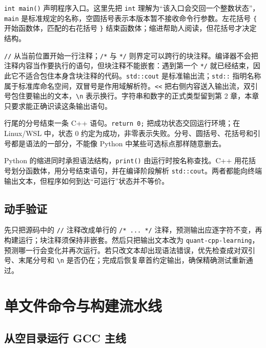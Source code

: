 \texttt{int main()} 声明程序入口。这里先把 \texttt{int} 理解为“该入口会交回一个整数状态”，\texttt{main} 是标准规定的名称，空圆括号表示本版本暂不接收命令行参数。左花括号 \texttt{\{} 开始函数体，匹配的右花括号 \texttt{\}} 结束函数体；缩进帮助人阅读，但花括号才决定结构。

\texttt{//} 从当前位置开始一行注释；\texttt{/*} 与 \texttt{*/} 则界定可以跨行的块注释。编译器不会把注释内容当作要执行的语句，但块注释不能嵌套：遇到第一个 \texttt{*/} 就已经结束，因此它不适合包住本身含块注释的代码。\texttt{std::cout} 是标准输出流；\texttt{std::} 指明名称属于标准库命名空间，双冒号是作用域解析符。\texttt{<<} 把右侧内容送入输出流，双引号包住要输出的文本，\texttt{\textbackslash n} 表示换行。字符串和数字的正式类型留到第 2 章，本章只要求能正确识读这条输出语句。

行尾的分号结束一条 C++ 语句。\texttt{return 0;} 把成功状态交回运行环境；在 Linux/WSL 中，状态 0 约定为成功，非零表示失败。分号、圆括号、花括号和引号都是语法的一部分，不能像 Python 中某些可选标点那样随意删去。

\begin{pythonbridge}
Python 的缩进同时承担语法结构，\texttt{print()} 由运行时按名称查找。C++ 用花括号划分函数体，用分号结束语句，并在编译阶段解析 \texttt{std::cout}。两者都能向终端输出文本，但程序如何到达“可运行”状态并不等价。

\end{pythonbridge}

\subsection{动手验证}

先只把源码中的 \texttt{//} 注释改成单行的 \texttt{/* ... */} 注释，预测输出应逐字符不变，再构建运行；块注释须保持非嵌套。然后只把输出文本改为 \texttt{quant-cpp-learning}，预测哪一行会变化并再次运行。若只改文本却出现语法错误，优先检查成对双引号、末尾分号和 \texttt{\textbackslash n} 是否仍在；完成后恢复章首约定输出，确保精确测试重新通过。

\section{单文件命令与构建流水线}

\subsection{从空目录运行 GCC 主线}

